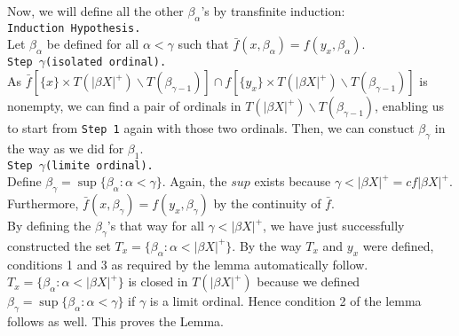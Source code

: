 \documentclass{article}
\begin{document}
\vskip 20pt

Now, we will define all the other $\beta_\alpha$'s by transfinite induction: \\

\texttt{Induction Hypothesis.}\\
Let $\beta_\alpha$ be defined for all $\alpha<\gamma$ such that $\bar{f}(x,\beta_\alpha)=f(y_x,\beta_\alpha)$.\\

\texttt{Step $\gamma$(isolated ordinal).}\\
As $\bar{f}[\{x\}\times T(|\beta X|^+)\backslash T(\beta_{\gamma-1})] \cap f[\{y_x\} \times T(|\beta X |^+)\backslash T(\beta_{\gamma-1})]$ is nonempty, we can find a pair of ordinals in  $T(|\beta X|^+)\backslash T(\beta_{\gamma-1})$, enabling us to start from \texttt{Step 1} again with those two ordinals. Then, we can constuct $\beta_\gamma$ in the way as we did for $\beta_1$.\\


\texttt{Step $\gamma$(limite ordinal).}\\
Define $\beta_\gamma = \sup\{\beta_\alpha: \alpha<\gamma\}.$ Again, the $sup$ exists because $\gamma < |\beta X|^+= cf|\beta X|^+.$ Furthermore, $\bar{f}(x,\beta_\gamma)=f(y_x,\beta_\gamma)$ by the continuity of $\bar{f}$.\\


By defining the $\beta_\gamma$'s that way for all $\gamma <|\beta X|^+$, we have just successfully constructed the set $T_x=\{\beta_\alpha: \alpha < |\beta X|^+\}$. By the way $T_x$ and $y_x$ were defined, conditions 1 and 3 as required by the lemma automatically follow.  $T_x=\{\beta_\alpha: \alpha < |\beta X|^+\}$ is
 closed in $T(|\beta X|^+)$ because we defined $\beta_\gamma = \sup\{\beta_\alpha: \alpha<\gamma\}$ if $\gamma$ is a limit ordinal. Hence condition 2 of the lemma follows as well. This proves the Lemma.
\end{document}
